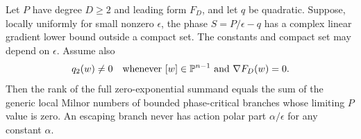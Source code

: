 \begin{proposition}
\label{prop:boundedregularrank}
Let $P$ have degree $D\ge2$ and leading form $F_D$, and let $q$
be quadratic. Suppose, locally uniformly for small nonzero
$\epsilon$, the phase $S=P/\epsilon-q$ has a complex linear
gradient lower bound outside a compact set. The constants and
compact set may depend on $\epsilon$. Assume also
\begin{equation}\label{eq:nonisoleading}
 q_2(w)\ne0\quad\hbox{whenever }[w]\in\mathbb P^{n-1}
                           \hbox{ and }\nabla F_D(w)=0.
\end{equation}
Then the rank of the full zero-exponential summand equals the sum
of the generic local Milnor numbers of bounded phase-critical
branches whose limiting $P$ value is zero. An escaping branch
never has action polar part $\alpha/\epsilon$ for any constant
$\alpha$.
\end{proposition}
